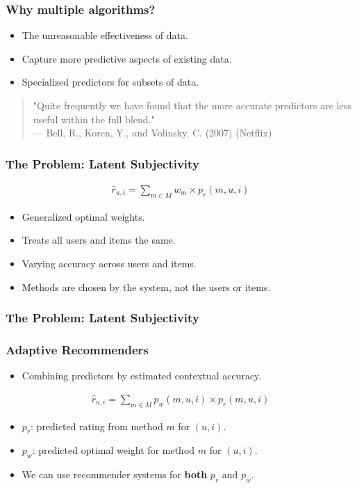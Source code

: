 \documentclass[screen]{beamer}
\begin{document}
\begin{frame}
  \frametitle{Why multiple algorithms?}
  \begin{itemize}
    \item The unreasonable effectiveness of data.
    \item Capture more predictive aspects of existing data.
    \item Specialized predictors for subsets of data.
  \end{itemize}
  \vspace{2em}
  \begin{quote}
    "Quite frequently we have found that the more accurate predictors are less useful within the full blend."\\
    --- Bell, R., Koren, Y., and Volinsky, C. (2007) (Netflix)
  \end{quote}  
\end{frame}

\begin{frame}
  \frametitle{The Problem: Latent Subjectivity}
  \begin{eqnarray}
    \hat{r}_{u,i} = \sum_{m \in M} w_{m} \times p_{r}(m,u,i)
  \end{eqnarray}
  \begin{itemize}
    \item Generalized optimal weights.
    \item Treats all users and items the same.
    \item Varying accuracy across users and items.
    \item Methods are chosen by the system, not the users or items.
  \end{itemize}
\end{frame}

\begin{frame}
  \frametitle{The Problem: Latent Subjectivity}
  \huge
\end{frame}

\begin{frame}
  \frametitle{Adaptive Recommenders}
  \begin{itemize}
    \item Combining predictors by estimated contextual accuracy.
  \end{itemize}
  \begin{eqnarray}
    \hat{r}_{u,i} = \sum_{m \in M} p_{w}(m,u,i) \times p_{r}(m,u,i)
  \end{eqnarray}
  \begin{itemize}
    \item $p_r$: predicted rating from method $m$ for $(u,i)$.
    \item $p_w$: predicted optimal weight for method $m$ for $(u,i)$.
    \item We can use recommender systems for \textbf{both} $p_r$ and $p_w$.
  \end{itemize}
\end{frame}
\end{document}
